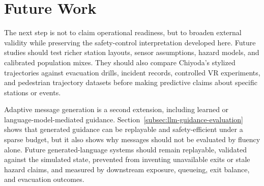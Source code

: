\section{Future Work}
\label{sec:future-work}

The next step is not to claim operational readiness, but to broaden external
validity while preserving the safety-control interpretation developed here.
Future studies should test richer station layouts, sensor assumptions, hazard
models, and calibrated population mixes. They should also compare Chiyoda's
stylized trajectories against evacuation drills, incident records, controlled
VR experiments, and pedestrian trajectory datasets before making predictive
claims about specific stations or events.

Adaptive message generation is a second extension, including learned or
language-model-mediated guidance. Section~\ref{subsec:llm-guidance-evaluation}
shows that generated guidance can be replayable and safety-efficient under a
sparse budget, but it also shows why messages should not be evaluated by
fluency alone. Future generated-language systems should remain replayable,
validated against the simulated state, prevented from inventing unavailable
exits or stale hazard claims, and measured by downstream exposure, queueing,
exit balance, and evacuation outcomes.
